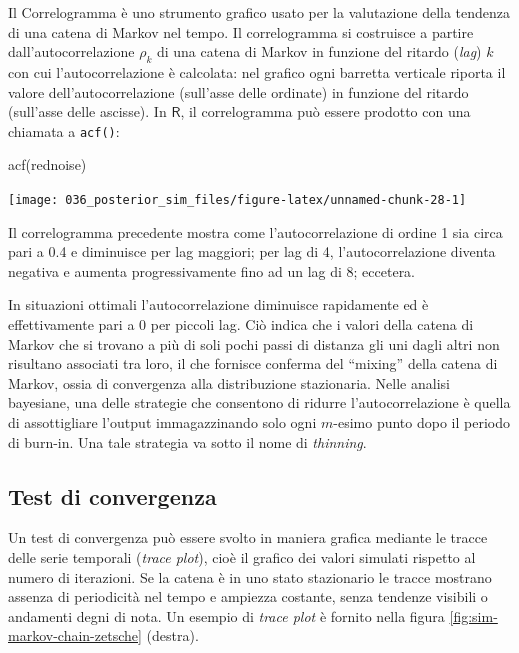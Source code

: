 \documentclass[
  10pt,
  italian,
  a4paper,
  extrafontsizes,onecolumn,openright
  ]{memoir}
\newenvironment{Shaded}{\begin{snugshade}}{\end{snugshade}}
\newcommand{\FunctionTok}[1]{\textcolor[rgb]{0.00,0.00,0.00}{#1}}
\newcommand{\NormalTok}[1]{#1}
\newcommand{\R}{\textsf{R}} %
\begin{document}
Il Correlogramma è uno strumento grafico usato per la valutazione della tendenza di una catena di Markov nel tempo. Il correlogramma si costruisce a partire dall'autocorrelazione \(\rho_k\) di una catena di Markov in funzione del ritardo (\emph{lag}) \(k\) con cui l'autocorrelazione è calcolata: nel grafico ogni barretta verticale riporta il valore dell'autocorrelazione (sull'asse delle ordinate) in funzione del ritardo (sull'asse delle ascisse). In \(\R\), il correlogramma può essere prodotto con una chiamata a \texttt{acf()}:

\begin{Shaded}
\begin{Highlighting}[]
\FunctionTok{acf}\NormalTok{(rednoise)}
\end{Highlighting}
\end{Shaded}

\begin{center}\texttt{[image: 036\_posterior\_sim\_files/figure-latex/unnamed-chunk-28-1]} \end{center}

Il correlogramma precedente mostra come l'autocorrelazione di ordine 1 sia circa pari a 0.4 e diminuisce per lag maggiori; per lag di 4, l'autocorrelazione diventa negativa e aumenta progressivamente fino ad un lag di 8; eccetera.

In situazioni ottimali l'autocorrelazione diminuisce rapidamente ed è effettivamente pari a 0 per piccoli lag. Ciò indica che i valori della catena di Markov che si trovano a più di soli pochi passi di distanza gli uni dagli altri non risultano associati tra loro, il che fornisce conferma del ``mixing'' della catena di Markov, ossia di convergenza alla distribuzione stazionaria.
Nelle analisi bayesiane, una delle strategie che consentono di ridurre l'autocorrelazione è quella di assottigliare l'output immagazzinando solo ogni \(m\)-esimo punto dopo il periodo di burn-in. Una tale strategia va sotto il nome di \emph{thinning}.

\hypertarget{test-di-convergenza}{%
\subsection{Test di convergenza}\label{test-di-convergenza}}

Un test di convergenza può essere svolto in maniera grafica mediante le tracce delle serie temporali (\emph{trace plot}), cioè il grafico dei valori simulati rispetto al numero di iterazioni. Se la catena è in uno stato stazionario le tracce mostrano assenza di periodicità nel tempo e ampiezza costante, senza tendenze visibili o andamenti degni di nota. Un esempio di \emph{trace plot} è fornito nella figura \ref{fig:sim-markov-chain-zetsche} (destra).
\end{document}
